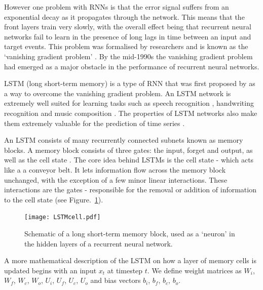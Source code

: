 However one problem with RNNs is that the error signal suffers from an exponential decay as it propagates through the network. This means that the front layers train very slowly, with the overall effect being that recurrent neural networks fail to learn in the presence of long lags in time between an input and target events. This problem was formalised by researchers and is known as the `vanishing gradient problem' \cite{hochreiter1991untersuchungen, hochreiter2001gradient}. By the mid-1990s the vanishing gradient problem had emerged as a major obstacle in the performance of recurrent neural networks.

LSTM (long short-term memory) is a type of RNN that was first proposed by \cite{Hochreiter:1997:LSM:1246443.1246450} as a way to overcome the vanishing gradient problem. An LSTM network is extremely well suited for learning tasks such as speech recognition \cite{Graves2005602}, handwriting recognition \cite{graves2008unconstrained} and music composition \cite{eck2002learning}. The properties of LSTM networks also make them extremely valuable for the prediction of time series \cite{gers2001applying}.

An LSTM consists of many recurrently connected subnets known as memory blocks. A memory block consists of three gates: the input, forget and output, as well as the cell state \cite{gers2000learning}. The core idea behind LSTMs is the cell state - which acts like a a conveyor belt. It lets information flow across the memory block unchanged, with the exception of a few minor linear interactions. These interactions are the gates - responsible for the removal or addition of information to the cell state (see Figure.~\ref{fig:lstmcell}).


\begin{figure}[t]
    \centering
    \texttt{[image: LSTMcell.pdf]}
    \caption[LSTM cell schematic]{Schematic of a long short-term memory block, used as a `neuron' in the hidden layers of a recurrent neural network.}
    \label{fig:lstmcell}
\end{figure}

A more mathematical description of the LSTM on how a layer of memory cells is updated begins with an input $x_t$ at timestep $t$. We define weight matrices as $W_i$, $W_f$, $W_c$, $W_o$, $U_i$, $U_f$, $U_c$, $U_o$ and bias vectors $b_i$, $b_f$, $b_c$, $b_o$.

